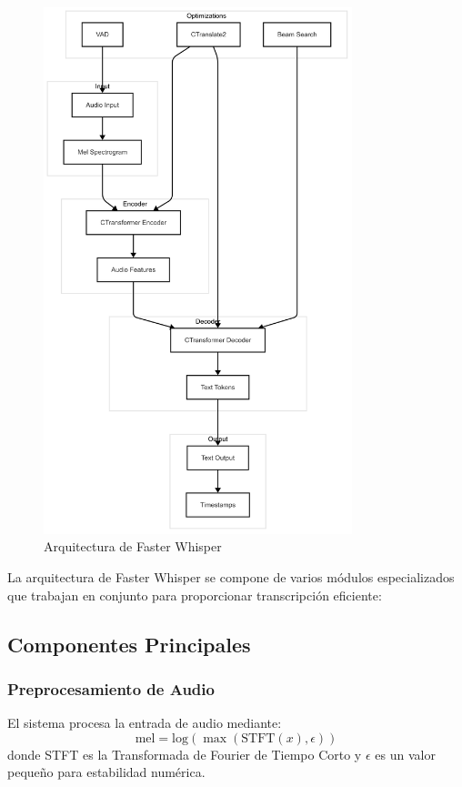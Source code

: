 \begin{figure}[H]
	\label{fig:whisper}
	\includegraphics[width=0.8\textwidth]{figuras/whisper.png}
	\caption{Arquitectura de Faster Whisper}
\end{figure}

La arquitectura de Faster Whisper se compone de varios módulos especializados que trabajan en conjunto para proporcionar transcripción eficiente:

\subsection{Componentes Principales}
\label{subsec:main-components}

\subsubsection{Preprocesamiento de Audio}
El sistema procesa la entrada de audio mediante:
\begin{equation}
	\text{mel} = \text{log}(\max(\text{STFT}(x), \epsilon))
\end{equation}
donde STFT es la Transformada de Fourier de Tiempo Corto y $\epsilon$ es un valor pequeño para estabilidad numérica.


